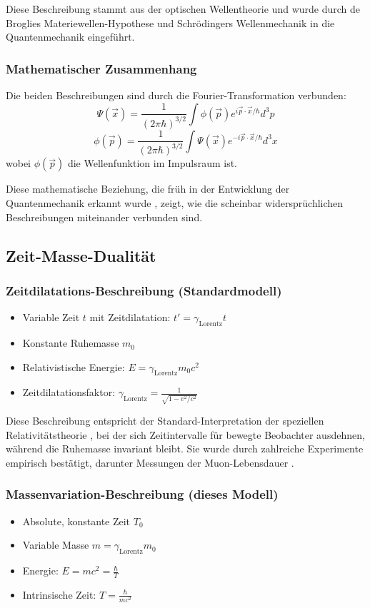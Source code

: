\documentclass[a4paper,12pt]{article}
\newcommand{\Tzero}{T_0}
\newcommand{\vecx}{\vec{x}}
\newcommand{\gammaf}{\gamma_{\text{Lorentz}}}
\begin{document}
	Diese Beschreibung stammt aus der optischen Wellentheorie und wurde durch de Broglies Materiewellen-Hypothese \cite{deBroglie1923} und Schrödingers Wellenmechanik \cite{Schrodinger1926} in die Quantenmechanik eingeführt.
	
	\subsubsection{Mathematischer Zusammenhang}
	Die beiden Beschreibungen sind durch die Fourier-Transformation verbunden:
	\[
	\Psi(\vecx) = \frac{1}{(2\pi\hbar)^{3/2}} \int \phi(\vec{p}) e^{i\vec{p}\cdot\vecx/\hbar} d^3p
	\]
	\[
	\phi(\vec{p}) = \frac{1}{(2\pi\hbar)^{3/2}} \int \Psi(\vecx) e^{-i\vec{p}\cdot\vecx/\hbar} d^3x
	\]
	wobei $\phi(\vec{p})$ die Wellenfunktion im Impulsraum ist.
	
	Diese mathematische Beziehung, die früh in der Entwicklung der Quantenmechanik erkannt wurde \cite{Born1926}, zeigt, wie die scheinbar widersprüchlichen Beschreibungen miteinander verbunden sind.
	
	\subsection{Zeit-Masse-Dualität}
	
	\subsubsection{Zeitdilatations-Beschreibung (Standardmodell)}
	\begin{itemize}
		\item Variable Zeit $t$ mit Zeitdilatation: $t' = \gammaf t$
		\item Konstante Ruhemasse $m_0$
		\item Relativistische Energie: $E = \gammaf m_0c^2$
		\item Zeitdilatationsfaktor: $\gammaf = \frac{1}{\sqrt{1-v^2/c^2}}$
	\end{itemize}
	
	Diese Beschreibung entspricht der Standard-Interpretation der speziellen Relativitätstheorie \cite{Einstein1905}, bei der sich Zeitintervalle für bewegte Beobachter ausdehnen, während die Ruhemasse invariant bleibt. Sie wurde durch zahlreiche Experimente empirisch bestätigt, darunter Messungen der Muon-Lebensdauer \cite{Bailey1977}.
	
	\subsubsection{Massenvariation-Beschreibung (dieses Modell)}
	\begin{itemize}
		\item Absolute, konstante Zeit $\Tzero$
		\item Variable Masse $m = \gammaf m_0$
		\item Energie: $E = mc^2 = \frac{\hbar}{T}$
		\item Intrinsische Zeit: $T = \frac{\hbar}{mc^2}$
	\end{itemize}
	
\end{document}
